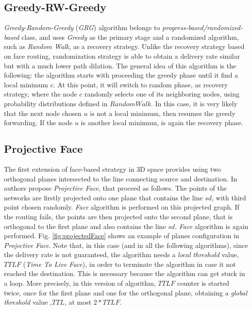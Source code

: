 \documentclass[journal,comsoc]{IEEEtran}
\begin{document}
\subsection{Greedy-RW-Greedy}
\emph{Greedy-Random-Greedy} (\emph{GRG}) algorithm belongs to \emph{progress-based/randomized-based} class, and uses \emph{Greedy} as the primary stage and a randomized algorithm, such as \emph{Random Walk}, as a recovery strategy. Unlike the recovery strategy based on face routing, randomization strategy is able to obtain a delivery rate similar but with a much lower path dilation. The general idea of this algorithm is the following: the algorithm starts with proceeding the greedy phase until it find a local minimum \(c\). At this point, it will switch to random phase, as recovery strategy, where the node \(c\) randomly selects one of its neighboring nodes, using probability distributions defined in \(Random Walk\). In this case, it is very likely that the next node chosen \(u\) is not a local minimum, then resumes the greedy forwarding. If the node \(u\) is another local minimum, is again the recovery phase.


\subsection{Projective Face}
The first extension of face-based strategy in 3D space provides using two orthogonal planes intersected to the line connecting source and destination. In \cite{kao:3d} authors propose \emph{Projective Face}, that proceed as follows. The points of the networks are firstly projected onto one plane that contains the line \(sd\), with third point chosen randomly. \emph{Face} algorithm is performed on this projected graph. If the routing fails, the points are then projected onto the second plane, that is orthogonal to the first plane and also contains the line \(sd\). \emph{Face} algorithm is again performed. Fig. \ref{fig:projectedFace} shows an example of planes configuration in \emph{Projective Face}. Note that, in this case (and in all the following algorithms), since the delivery rate is not guaranteed, the algorithm needs a \emph{local threshold} value, \(TTLF\) (\emph{Time To Live Face}), in order to terminate the algorithm in case it not reached the destination. This is necessary because the algorithm can get stuck in a loop. More precisely, in this version of algorithm, \(TTLF\) counter is started twice, once for the first plane and one for the orthogonal plane, obtaining a \emph{global threshold} value ,\(TTL\), at most \(2*TTLF\).
\end{document}
